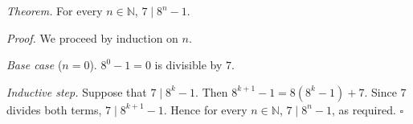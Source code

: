 \textit{Theorem.} For every $n \in \mathbb{N}$, $7 \mid 8^{n} - 1$.

\textit{Proof.} We proceed by induction on $n$.

\textit{Base case} ($n = 0$). $8^{0} - 1 = 0$ is divisible by $7$.

\textit{Inductive step.} Suppose that $7 \mid 8^{k} - 1$.
Then $8^{k + 1} - 1 = 8(8^{k} - 1) + 7$.
Since $7$ divides both terms, $7 \mid 8^{k + 1} - 1$.
Hence for every $n \in \mathbb{N}$, $7 \mid 8^{n} - 1$, as required. \hfill$\square$